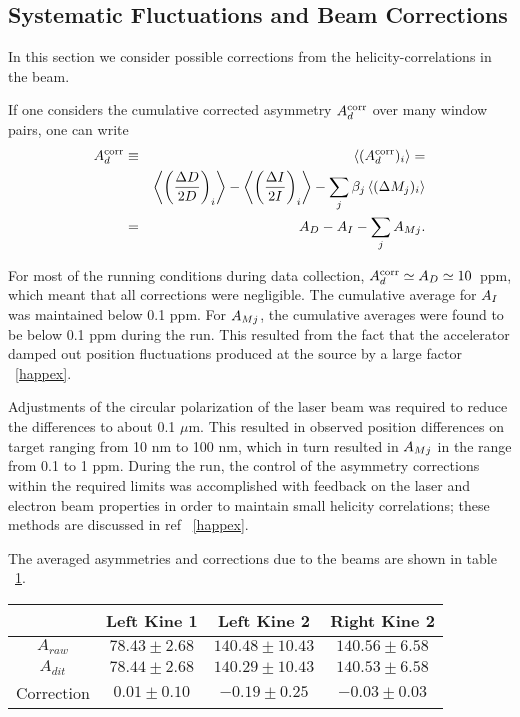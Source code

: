 \subsection{Systematic Fluctuations and Beam Corrections}
\label{sec:beamcorr}

In this section we consider possible corrections from
the helicity-correlations in the beam.

If one considers the cumulative corrected asymmetry
$A^{\rm corr}_d$ over many window pairs, one can write
\begin{eqnarray}
A^{\rm corr}_d & \equiv & \langle (A^{\rm corr}_d)_i\rangle = 
\nonumber \\
&  & 
\left\langle\left(\frac{\Delta D}{2D}\right)_i\right\rangle -
\left\langle\left(\frac{\Delta I}{2I}\right)_i\right\rangle
- \sum_j {\beta_j\left\langle{(\Delta M_j)_i}\right\rangle} 
\nonumber \\
&=& A_D -  A_I - \sum_j A_{Mj}.
\end{eqnarray}

For most of the running conditions during data collection,
$A^{\rm corr}_d\simeq A_D\simeq 10$~ppm, which meant that all
corrections were negligible. The cumulative average for $A_I$ was
maintained below 0.1 ppm. For $A_{Mj}$, the cumulative averages
were found to be below 0.1 ppm during the run.
This resulted from the fact that the accelerator
damped out position fluctuations produced at the source by a large
factor ~\ref{happex}.

Adjustments of the circular polarization of the
laser beam was required to reduce the differences to about 0.1 $\mu$m. 
This resulted in observed position differences on target
ranging from 10 nm to 100 nm, which in turn resulted in $A_{Mj}$
in the range from 0.1 to 1 ppm.
During the run, the control of the asymmetry corrections 
within the required limits was accomplished with feedback on 
the laser and electron beam properties in order to maintain 
small helicity correlations; these methods are 
discussed in ref ~\ref{happex}.

The averaged asymmetries and corrections due to the beams 
are shown in table ~\ref{tab:beamcorr}.

\begin{table}[!ht]
\begin{center}
\begin{tabular}{c|c|c|c}
\hline\hline
           &   Left Kine 1     &     Left Kine 2      &      Right Kine 2\\ \hline
$A_{raw}$    &  $78.43 \pm 2.68$ & $140.48 \pm 10.43$   &  $140.56 \pm 6.58$\\ \hline
$A_{dit}$    &  $78.44 \pm 2.68$ & $140.29 \pm 10.43$   &  $140.53 \pm 6.58$\\ \hline
Correction &  $0.01 \pm 0.10$      & $-0.19 \pm 0.25$         &  $-0.03 \pm 0.03$ \\ \hline
\hline
\end{tabular}
\end{center}
\label{tab:beamcorr}
\end{table}


